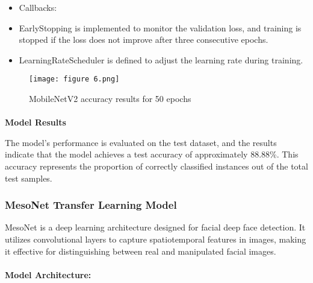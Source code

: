 \documentclass{article}
\begin{document}
\begin{itemize}
    \item Callbacks:
\end{itemize}
\begin{itemize}
    \begin{itemize}
        \item EarlyStopping is implemented to monitor the validation loss, and training is stopped if the loss does not improve after three consecutive epochs.
        \item LearningRateScheduler is defined to adjust the learning rate during training.
    \end{itemize}
\end{itemize}

\begin{figure}[h]
    \centering
    \texttt{[image: figure 6.png]}
    \caption{MobileNetV2 accuracy results for 50 epochs}
    \label{fig:enter-label}
\end{figure}

\paragraph{}
\textbf{Model Results }

The model's performance is evaluated on the test dataset, and the results indicate that the model achieves a test accuracy of approximately 88.88\%. This accuracy represents the proportion of correctly classified instances out of the total test samples.


\subsubsection{MesoNet Transfer Learning Model}

MesoNet is a deep learning architecture designed for facial deep face detection. It utilizes convolutional layers to capture spatiotemporal features in images, making it effective for distinguishing between real and manipulated facial images.
\paragraph{}
\textbf{Model Architecture:}
\end{document}
